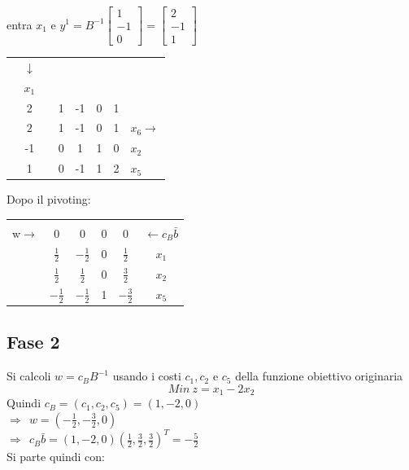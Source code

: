 entra $x_{1}$ e $y^{1}=B^{-1}\begin{bmatrix}1\\-1\\0\end{bmatrix}=\begin{bmatrix}2\\-1\\1\end{bmatrix}$
\begin{table}[!h]
	\centering
	\def\arraystretch{1.35}
	\begin{tabular}{r|c|c|ccc|c|l}
		\multicolumn{1}{c}{} & \multicolumn{1}{c}{$\downarrow$} & \multicolumn{1}{c}{} &  &  & \multicolumn{1}{c}{} & \multicolumn{1}{c}{} & \\
		\multicolumn{1}{c}{} & \multicolumn{1}{c}{$x_{1}$} & \multicolumn{1}{c}{} &  &  & \multicolumn{1}{c}{} & \multicolumn{1}{c}{} & \\ \cline{2-2} \cline{4-7}
		& 2 &  & 1 & -1 & 0 & 1 &  \\ \cline{2-2} \cline{4-7}
		& {\LARGE \textcircled{\normalsize $2$}} &  & 1 & -1 & 0 & 1 & $x_{6}\rightarrow$ \\
		& -1 &  & 0 & 1 & 1 & 0 & $x_{2}$ \\
		& 1 &  & 0 & -1 & 1 & 2 & $x_{5}$ \\
		\cline{2-2} \cline{4-7}
	\end{tabular}
\end{table}
\clearpage
Dopo il pivoting:
\begin{table}[!h]
	\def\arraystretch{2.1}
	\centering
	\begin{tabular}{c|ccc|c|c}
		\multicolumn{1}{c}{} & \multicolumn{1}{c}{} & & \multicolumn{1}{c}{} & \multicolumn{1}{c}{} & \\ \cline{2-5}
		w$\rightarrow$ & 0 & 0 & 0 & 0 & $\leftarrow c_{B}\bar{b}$ \\ \cline{2-5}
		& $\frac{1}{2}$ & $-\frac{1}{2}$ & 0 & $\frac{1}{2}$ & $x_{1}$ \\
		& $\frac{1}{2}$ & $\frac{1}{2}$ & 0 & $\frac{3}{2}$ & $x_{2}$ \\
		& $-\frac{1}{2}$ & $-\frac{1}{2}$ & 1 & $-\frac{3}{2}$ & $x_{5}$ \\ \cline{2-5}
	\end{tabular}
\end{table}

\subsection{Fase 2}
Si calcoli $w=c_{B}B^{-1}$ usando i costi $c_{1},c_{2}$ e $c_{5}$ della funzione obiettivo originaria
\begin{equation*}
	Min\ z=x_{1}-2x_{2}
\end{equation*}
Quindi $c_{B}=(c_{1},c_{2},c_{5})=(1,-2,0)$\\
$\Rightarrow\ \ w=(-\frac{1}{2},-\frac{3}{2},0)$\\
$\Rightarrow\ \ c_{B}\bar{b}=(1,-2,0)(\frac{1}{2},\frac{3}{2},\frac{3}{2})^{T}=-\frac{5}{2}$\\
Si parte quindi con:

